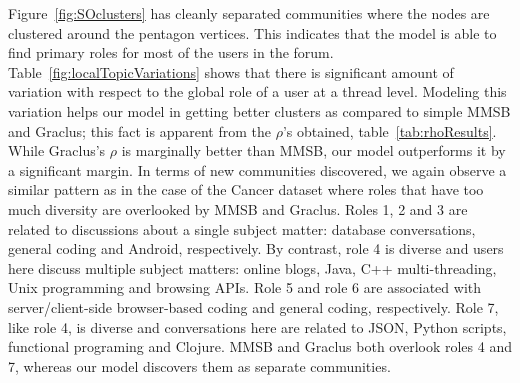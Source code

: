 \documentclass{sig-alternate}
\newcommand{\abhi}[1]{\textcolor{blue}{\\ abhi-comment: #1}}
\begin{document}
Figure~\ref{fig:SOclusters} has cleanly separated communities
where the nodes are clustered
around the pentagon vertices. This indicates that the model is able to find
primary roles for most of the users in the forum.  
Table~\ref{fig:localTopicVariations} shows that there is significant amount of
variation with respect to the global role of a user at a thread level. 
Modeling this variation helps our model in
getting better clusters as compared to simple MMSB and Graclus; 
this fact is apparent from
the $\rho$'s obtained, table~\ref{tab:rhoResults}. 
While Graclus's $\rho$ is marginally better than MMSB, our model outperforms
it by a significant margin. 
In terms of new communities discovered, we again observe a similar pattern
as in the case of the Cancer dataset where roles that have too much diversity 
are overlooked by MMSB and Graclus. 
Roles 1, 2 and 3 are related to discussions about a single
subject matter: database 
conversations, general coding and Android, respectively. 
By contrast, role 4 is diverse and users here discuss multiple 
subject matters: 
online blogs, Java, C++ multi-threading, Unix programming and browsing APIs. 
Role 5 and role 6 are associated with server/client-side browser-based 
coding and general coding, respectively. Role 7, like role 4, is diverse and 
conversations here are related to JSON, Python scripts, functional programing and
Clojure. MMSB and Graclus both overlook roles 4 and 7, whereas our model
discovers them as separate communities.

\end{document}
